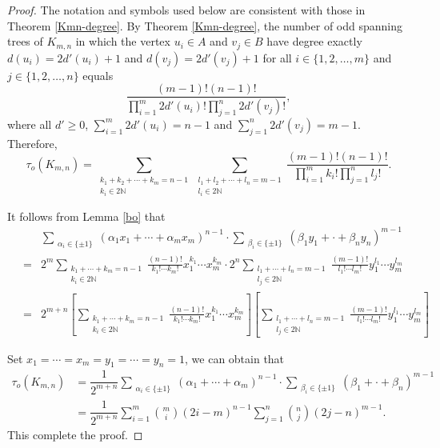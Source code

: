 \documentclass[10pt,a4paper]{amsart}
\begin{document}
\begin{proof}
	The notation and symbols used below are consistent with those in Theorem \ref{Kmn-degree}. 
By Theorem \ref{Kmn-degree}, the number of odd spanning trees of $K_{m,n}$ 
in which the vertex $u_i\in A$ and $v_j\in B$ have degree exactly $d(u_i)=2d'(u_i)+1$ and $d(v_j)=2d'(v_j)+1$ 
for all $i\in\{1,2,\dots,m\}$ and $j\in\{1,2,\dots,n\}$ equals
$$
	\frac{(m-1)!(n-1)!}{\prod_{i=1}^{m}2d'(u_i)!\prod_{j=1}^{n}2d'(v_j)!},
	$$
	where all $d'\geq0$, $\sum_{i=1}^{m}2d'(u_i)=n-1$ and $\sum_{j=1}^{n}2d'(v_j)=m-1$. 
Therefore, 
$$\tau_o(K_{m,n})=\sum_{\substack{k_1+k_2+\cdots+k_m=n-1\\k_i\in 2\mathbb{N} }}
                  \sum_{\substack{l_1+l_2+\cdots+l_n=m-1\\l_i\in 2\mathbb{N} }}\frac{(m-1)!(n-1)!}{\prod_{i=1}^{m}k_i!\prod_{j=1}^{n}l_j!}.$$

It follows from Lemma \ref{bo} that
\begin{eqnarray*}
\ &  & \sum_{\substack{\alpha_i \in \{\pm1\}}}(\alpha_1x_1+\cdots+\alpha_mx_m)^{n-1}
        \cdot\sum_{\substack{\beta_i \in \{\pm1\}}}(\beta_1y_1+\cdot+\beta_ny_n)^{m-1} \\
& = & 2^m\sum_{\substack{k_1+\cdots+k_m=n-1\\k_i\in 2\mathbb{N}}}\frac{(n-1)!}{k_1!\cdots k_m!}x_1^{k_1}\cdots x_m^{k_m}
      \cdot2^n\sum_{\substack{l_1+\cdots+l_n=m-1\\l_j\in 2\mathbb{N}}}\frac{(m-1)!}{l_1!\cdots l_m!}y_1^{l_1}\cdots y_m^{l_m} \\
& = & 2^{m+n}\left[\sum_{\substack{k_1+\cdots+k_m=n-1\\k_i\in 2\mathbb{N}}}\frac{(n-1)!}{k_1!\cdots k_m!}x_1^{k_1}\cdots x_m^{k_m}\right]
      \left[\sum_{\substack{l_1+\cdots+l_n=m-1\\l_j\in 2\mathbb{N}}}\frac{(m-1)!}{l_1!\cdots l_m!}y_1^{l_1}\cdots y_m^{l_m}\right]
\end{eqnarray*}

Set $x_1=\cdots=x_m=y_1=\cdots=y_n=1$, we can obtain that
	\begin{align*}
		\tau_o(K_{m,n})&=\dfrac{1}{2^{m+n}}\sum_{\substack{\alpha_i \in \{\pm1\}}}(\alpha_1+\cdots+\alpha_m)^{n-1}\cdot\sum_{\substack{\beta_i \in \{\pm1\}}}(\beta_1+\cdot+\beta_n)^{m-1}\\
		&=\dfrac{1}{2^{m+n}}\sum_{i=1}^{m}\binom{m}{i}(2i-m)^{n-1}\sum_{j=1}^{n}\binom{n}{j}(2j-n)^{m-1}.
	\end{align*}
	This complete the proof.
\end{proof}
\end{document}
